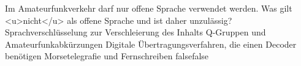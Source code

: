     {Im Amateurfunkverkehr darf nur offene Sprache verwendet werden. Was gilt <u>nicht</u> als offene Sprache und ist daher unzulässig?}
    {Sprachverschlüsselung zur Verschleierung des Inhalts}
    {Q-Gruppen und Amateurfunkabkürzungen}
    {Digitale Übertragungsverfahren, die einen Decoder benötigen}
    {Morsetelegrafie und Fernschreiben}
    {false}{false}